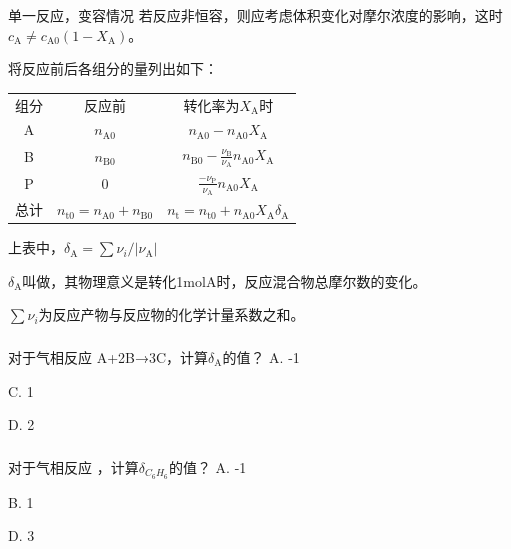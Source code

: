 \begin{frame}{单一反应，变容情况}
    若反应非恒容，则应考虑体积变化对摩尔浓度的影响，这时$c_\mathrm{A} \neq c_\mathrm{A0}(1-X_\mathrm{A})$。
    
    将反应前后各组分的量列出如下：
    \begin{table}
        \centering
        \begin{tabular}{ccc}
            组分 & 反应前 & 转化率为$X_\mathrm{A}$时  \\ 
            A & $n_\mathrm{A0}$ & $n_\mathrm{A0}-n_\mathrm{A0}X_\mathrm{A}$  \\ 
            B & $n_\mathrm{B0}$ & $n_\mathrm{B0}-\frac{\nu_\mathrm{B}}{\nu_\mathrm{A}}n_\mathrm{A0}X_\mathrm{A}$  \\ 
            P & 0 & $\frac{-\nu_\mathrm{P}}{\nu_\mathrm{A}}n_\mathrm{A0}X_\mathrm{A}$ \\ \toprule
            总计 & $n_\mathrm{t0}=n_\mathrm{A0}+n_\mathrm{B0}$ & $n_\mathrm{t}=n_\mathrm{t0}+n_\mathrm{A0}X_\mathrm{A}\delta_\mathrm{A}$ \\ 
        \end{tabular}
    \end{table}
    
    上表中，$\delta_\mathrm{A}=\sum \nu_i/|\nu_\mathrm{A}|$
    
    $\delta_\mathrm{A}$叫做，其物理意义是转化1molA时，反应混合物总摩尔数的变化。
    
    $\sum \nu_i$为反应产物与反应物的化学计量系数之和。
\end{frame}


\begin{frame}[t]
    \frametitle{}
    \begin{question}
        对于气相反应 A+2B→3C，计算$\delta_\mathrm{A}$的值？
        \tcblower
        A. -1


        C. 1

        D. 2
    \end{question}
\end{frame}


\begin{frame}[t]
    \frametitle{}
    \begin{question}
        对于气相反应 ，计算$\delta_{C_6H_6}$的值？
        \tcblower
        A. -1

        B. 1


        D. 3
    \end{question}
\end{frame}


